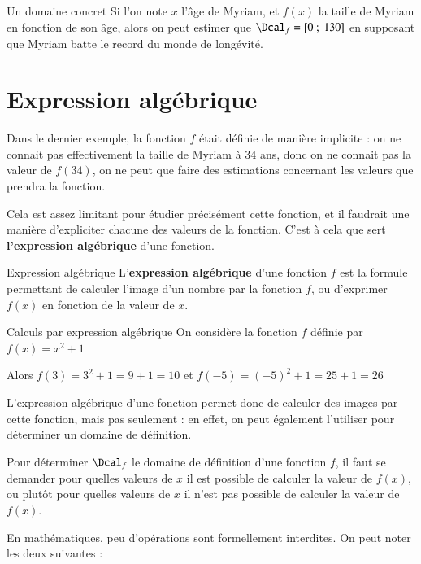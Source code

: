 \documentclass[oneside,12pt]{article}          %
\begin{document}
\begin{exemple}{Un domaine concret}
	Si l'on note $x$ l'âge de Myriam, et $f(x)$ la taille de Myriam en fonction de son âge, alors on peut estimer que $\Dcal_f = [0 ~;~ 130]$ en supposant que Myriam batte le record du monde de longévité.
\end{exemple}



\section{Expression algébrique}

Dans le dernier exemple, la fonction $f$ était définie de manière implicite : on ne connait pas effectivement la taille de Myriam à 34 ans, donc on ne connait pas la valeur de $f(34)$, on ne peut que faire des estimations concernant les valeurs que prendra la fonction.

Cela est assez limitant pour étudier précisément cette fonction, et il faudrait une manière d'expliciter chacune des valeurs de la fonction. C'est à cela que sert \textbf{l'expression algébrique} d'une fonction.

\begin{definition}{Expression algébrique}
	L'\textbf{expression algébrique} d'une fonction $f$ est la formule permettant de calculer l'image d'un nombre par la fonction $f$, ou d'exprimer $f(x)$ en fonction de la valeur de $x$.
\end{definition}


\begin{exemple}{Calculs par expression algébrique}
	On considère la fonction $f$ définie par $f(x)=x^2+1$
	
	Alors $f(3)=3^2 + 1 = 9 + 1 = 10$ \quad et \quad $f(-5) = (-5)^2 + 1 = 25 + 1 = 26$
\end{exemple}


L'expression algébrique d'une fonction permet donc de calculer des images par cette fonction, mais pas seulement : en effet, on peut également l'utiliser pour déterminer un domaine de définition.

Pour déterminer $\Dcal_f$ le domaine de définition d'une fonction $f$, il faut se demander pour quelles valeurs de $x$ il est possible de calculer la valeur de $f(x)$, ou plutôt pour quelles valeurs de $x$ il n'est pas possible de calculer la valeur de $f(x)$.

En mathématiques, peu d'opérations sont formellement interdites. On peut noter les deux suivantes :
\end{document}
